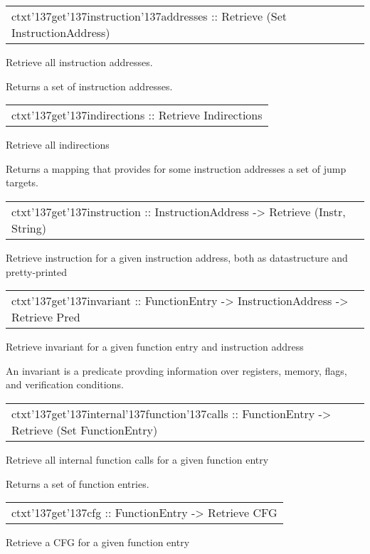 \begin{haddockdesc}
\item[\begin{tabular}{@{}l}
ctxt{\char '137}get{\char '137}instruction{\char '137}addresses :: Retrieve (Set InstructionAddress)
\end{tabular}]
{\haddockbegindoc
Retrieve all instruction addresses.\par
Returns a set of instruction addresses.\par}
\end{haddockdesc}
\begin{haddockdesc}
\item[\begin{tabular}{@{}l}
ctxt{\char '137}get{\char '137}indirections :: Retrieve Indirections
\end{tabular}]
{\haddockbegindoc
Retrieve all indirections\par
Returns a mapping that provides for some instruction addresses a set of jump targets.\par}
\end{haddockdesc}
\begin{haddockdesc}
\item[\begin{tabular}{@{}l}
ctxt{\char '137}get{\char '137}instruction :: InstructionAddress -> Retrieve (Instr, String)
\end{tabular}]
{\haddockbegindoc
Retrieve instruction for a given instruction address, both as datastructure and pretty-printed\par}
\end{haddockdesc}
\begin{haddockdesc}
\item[\begin{tabular}{@{}l}
ctxt{\char '137}get{\char '137}invariant :: FunctionEntry -> InstructionAddress -> Retrieve Pred
\end{tabular}]
{\haddockbegindoc
Retrieve invariant for a given function entry and instruction address\par
An invariant is a predicate provding information over registers, memory, flags, and verification conditions.\par}
\end{haddockdesc}
\begin{haddockdesc}
\item[\begin{tabular}{@{}l}
ctxt{\char '137}get{\char '137}internal{\char '137}function{\char '137}calls :: FunctionEntry -> Retrieve (Set FunctionEntry)
\end{tabular}]
{\haddockbegindoc
Retrieve all internal function calls for a given function entry\par
Returns a set of function entries.\par}
\end{haddockdesc}
\begin{haddockdesc}
\item[\begin{tabular}{@{}l}
ctxt{\char '137}get{\char '137}cfg :: FunctionEntry -> Retrieve CFG
\end{tabular}]
{\haddockbegindoc
Retrieve a CFG for a given function entry\par}
\end{haddockdesc}